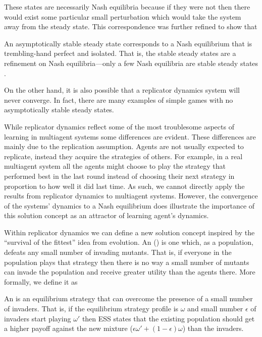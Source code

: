 These states are necessarily Nash equilibria because if they were not
then there would exist some particular small perturbation which would
take the system away from the steady state.  This correspondence was
further refined to show that

\begin{theorem}
  An asymptotically stable steady state corresponds to a Nash
  equilibrium that is trembling-hand perfect and isolated. That is,
  the stable steady states are a refinement on Nash equilibria---only
  a few Nash equilibria are stable steady states \cite{bomze86a}.
\end{theorem}
On the other hand, it is also possible that a replicator
dynamics system will never converge. In fact, there are many examples
of simple games with no asymptotically stable steady states.

While replicator dynamics reflect some of the most troublesome aspects
of learning in multiagent systems some differences are evident. These
differences are mainly due to the replication assumption. Agents are
not usually expected to replicate, instead they acquire the strategies
of others.  For example, in a real multiagent system all the agents
might choose to play the strategy that performed best in the last
round instead of choosing their next strategy in proportion to how
well it did last time. As such, we cannot directly apply the results
from replicator dynamics to multiagent systems. However, the
convergence of the systems' dynamics to a Nash equilibrium does
illustrate the importance of this solution concept as an attractor of
learning agent's dynamics.



Within replicator dynamics we can define a new solution concept
inspired by the ``survival of the fittest'' idea from evolution. An
 () is one which, as a
population, defeats any small number of invading mutants. That is, if
everyone in the population plays that strategy then there is no way a
small number of mutants can invade the population and receive greater
utility than the agents there. More formally, we define it as

\begin{definition} An  is an
  equilibrium strategy that can overcome the presence of a small
  number of invaders. That is, if the equilibrium strategy profile is
  $\omega$ and small number $\epsilon$ of invaders start playing
  $\omega'$ then ESS states that the existing population should get a
  higher payoff against the new mixture ($\epsilon\omega' + (1 -
  \epsilon)\omega$) than the invaders.
\end{definition}


